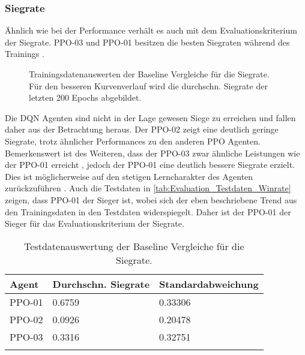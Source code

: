 \subsubsection{Siegrate} \label{subsubsec:Evaluation_Siegrate}
Ähnlich wie bei der Performance verhält es auch mit dem Evaluationskriterium der Siegrate. PPO-03 und PPO-01 besitzen die besten Siegraten während des Trainings .
\begin{figure}[H]
	\centering
	
	\caption[Siegrate- Auswertung der Trainingsdaten der Baseline Vergleiche]{Trainingsdatenauswerten der Baseline Vergleiche für die Siegrate. Für den besseren Kurvenverlauf wird die durchschn. Siegrate der letzten 200 Epochs abgebildet.}
	\label{fig:Evaluation_Baseline_winrate}
\end{figure}
Die DQN Agenten sind nicht in der Lage gewesen Siege zu erreichen und fallen daher aus der Betrachtung heraus.
Der PPO-02 zeigt eine deutlich geringe Siegrate, trotz ähnlicher Performances zu den anderen PPO Agenten.
Bemerkenswert ist des Weiteren, dass der PPO-03 zwar ähnliche Leistungen wie der PPO-01 erreicht \linebreak[4] , jedoch der PPO-01 eine deutlich bessere Siegrate erzielt. Dies ist möglicherweise auf den stetigen Lerncharakter des Agenten zurückzuführen .
Auch die Testdaten in \autoref{tab:Evaluation_Testdaten_Winrate} zeigen, dass PPO-01 der Sieger ist, wobei sich der eben beschriebene Trend aus den Trainingsdaten in den Testdaten widerspiegelt. Daher ist der PPO-01 der Sieger für das Evaluationskriterium der Siegrate.
\begin{longtable}[H]{|p{4.5cm}|p{4.5cm}|p{4.5cm}|}
	\hline
	Agent & Durchschn. Siegrate & Standardabweichung \\
	\hline
	PPO-01 & 0.6759 & 0.33306 \\
	\hline
	PPO-02 & 0.0926 & 0.20478 \\
	\hline
	PPO-03 & 0.3316 & 0.32751 \\
	\hline
	\caption{Testdatenauswertung der Baseline Vergleiche für die Siegrate.}
	\label{tab:Evaluation_Testdaten_Winrate} 
\end{longtable}

